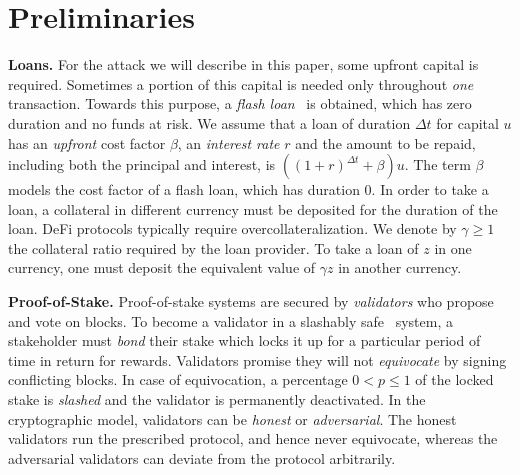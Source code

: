 \section{Preliminaries}\label{sec:preliminaries}


\noindent
\textbf{Loans.} For the attack we will describe in this paper, some upfront
capital is required. Sometimes a portion of this capital is needed only throughout \emph{one}
transaction. Towards this purpose, a \emph{flash loan}~\cite{gudgeon2020defi} is obtained,
which has zero duration and no funds at risk. We assume that
a loan of duration $\Delta t$ for capital $u$ has an \emph{upfront} cost factor $\beta$,
an \emph{interest rate} $r$ and the amount to be repaid, including both the principal and interest, is
$((1 + r)^{\Delta t} + \beta) u$. The term $\beta$ models the cost factor of a flash loan,
which has duration $0$.
In order to take a loan, a collateral in different currency must be deposited for the duration
of the loan. DeFi protocols typically require overcollateralization. We denote by
$\gamma \geq 1$ the collateral ratio required by the loan provider.
To take a loan of $z$ in one currency, one must deposit the equivalent
value of $\gamma z$ in another currency.

\noindent
\textbf{Proof-of-Stake.} Proof-of-stake systems are secured
by \emph{validators} who propose and vote
on blocks. To become a validator in a slashably safe~\cite{slashable-safety}
system, a stakeholder must \emph{bond} their stake
which locks it up for a particular period of time in return for rewards.
Validators promise they will
not \emph{equivocate} by signing conflicting blocks.
In case of equivocation, a percentage $0 < p \leq 1$ of the locked stake is
\emph{slashed} and the validator is permanently deactivated. In the cryptographic
model, validators can be \emph{honest} or \emph{adversarial}. The honest validators
run the prescribed protocol, and hence never equivocate, whereas the adversarial
validators can deviate from the protocol arbitrarily.

